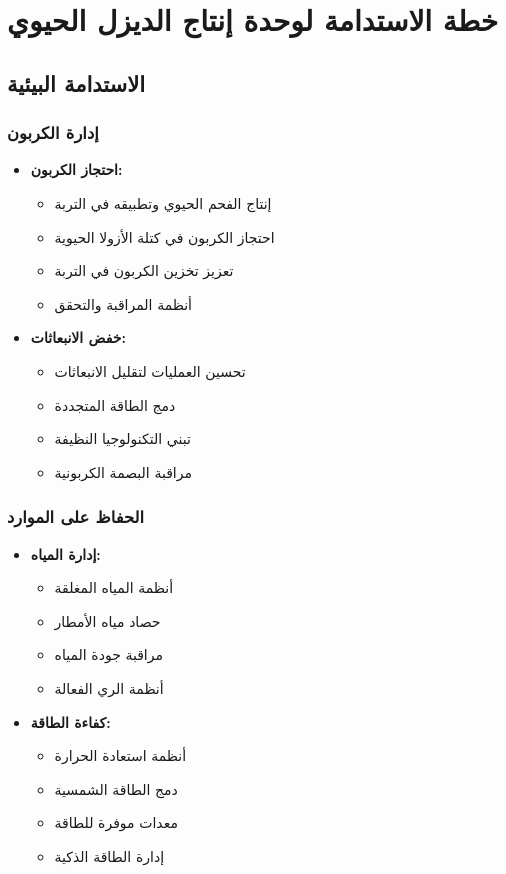 \section{خطة الاستدامة لوحدة إنتاج الديزل الحيوي}

\subsection{الاستدامة البيئية}

\subsubsection{إدارة الكربون}
\begin{itemize}
    \item \textbf{احتجاز الكربون:}
    \begin{itemize}
        \item إنتاج الفحم الحيوي وتطبيقه في التربة
        \item احتجاز الكربون في كتلة الأزولا الحيوية
        \item تعزيز تخزين الكربون في التربة
        \item أنظمة المراقبة والتحقق
    \end{itemize}
    
    \item \textbf{خفض الانبعاثات:}
    \begin{itemize}
        \item تحسين العمليات لتقليل الانبعاثات
        \item دمج الطاقة المتجددة
        \item تبني التكنولوجيا النظيفة
        \item مراقبة البصمة الكربونية
    \end{itemize}
\end{itemize}

\subsubsection{الحفاظ على الموارد}
\begin{itemize}
    \item \textbf{إدارة المياه:}
    \begin{itemize}
        \item أنظمة المياه المغلقة
        \item حصاد مياه الأمطار
        \item مراقبة جودة المياه
        \item أنظمة الري الفعالة
    \end{itemize}
    
    \item \textbf{كفاءة الطاقة:}
    \begin{itemize}
        \item أنظمة استعادة الحرارة
        \item دمج الطاقة الشمسية
        \item معدات موفرة للطاقة
        \item إدارة الطاقة الذكية
    \end{itemize}
\end{itemize}

